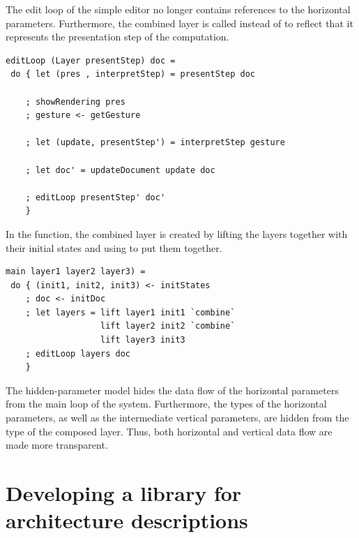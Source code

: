 \documentclass[preprint,natbib]{sigplanconf}
\begin{document}

The edit loop of the simple editor no longer contains references to the horizontal parameters. Furthermore, the combined layer is called  instead of  to reflect that it represents the presentation step of the computation.

\begin{small}
\begin{verbatim}
editLoop (Layer presentStep) doc = 
 do { let (pres , interpretStep) = presentStep doc
    
    ; showRendering pres
    ; gesture <- getGesture
    
    ; let (update, presentStep') = interpretStep gesture
    
    ; let doc' = updateDocument update doc
    
    ; editLoop presentStep' doc'
    }
\end{verbatim}
\end{small}

In the  function, the combined layer is created by lifting the layers together with their initial states and using  to put them together.

\begin{small}
\begin{verbatim}
main layer1 layer2 layer3) =
 do { (init1, init2, init3) <- initStates
    ; doc <- initDoc 
    ; let layers = lift layer1 init1 `combine` 
                   lift layer2 init2 `combine`
                   lift layer3 init3
    ; editLoop layers doc
    }
\end{verbatim}
\end{small}


The hidden-parameter model hides the data flow of the horizontal parameters from the main loop of the system. Furthermore, the types of the horizontal parameters, as well as the intermediate vertical parameters, are hidden from the type of the composed layer. Thus, both horizontal and vertical data flow are made more transparent. 



%																
%																
%																
\section{Developing a library for architecture descriptions} \label{sect:lib}
\end{document}
